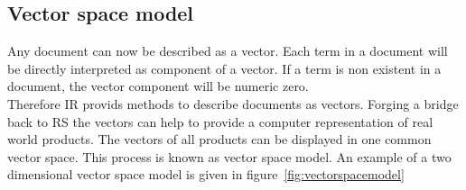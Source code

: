 \subsection{Vector space model}
\label{sec:vectorspacemodel}
Any document can now be described as a vector.
Each term in a document will be directly interpreted as component of a vector.
If a term is non existent in a document, the vector component will be numeric zero.\citep[p.~120]{manning:2009}\\
Therefore IR provids methods to describe documents as vectors.
Forging a bridge back to RS the vectors can help to provide a computer representation of real world products.
The vectors of all products can be displayed in one common vector space.
This process is known as vector space model.\citep[p.~120]{manning:2009}
An example of a two dimensional vector space model is given in figure~\ref{fig:vectorspacemodel}


